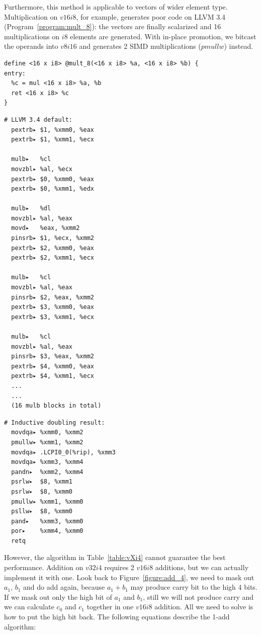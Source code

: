 Furthermore, this method is applicable to vectors of wider element type. Multiplication on $v16i8$, for example, generates poor code on LLVM 3.4 (Program~\ref{program:mult_8}): the vectors are finally scalarized and 16 multiplications on $i8$ elements are generated. With in-place promotion, we bitcast the operands into $v8i16$ and generates 2 SIMD multiplications ($pmullw$) instead.

\begin{program}
\begin{verbatim}
define <16 x i8> @mult_8(<16 x i8> %a, <16 x i8> %b) {
entry:
  %c = mul <16 x i8> %a, %b
  ret <16 x i8> %c
}
\end{verbatim}
\begin{multicols}{2}
\begin{verbatim}
# LLVM 3.4 default:
  pextrb▸ $1, %xmm0, %eax
  pextrb▸ $1, %xmm1, %ecx

  mulb▸   %cl
  movzbl▸ %al, %ecx
  pextrb▸ $0, %xmm0, %eax
  pextrb▸ $0, %xmm1, %edx

  mulb▸   %dl
  movzbl▸ %al, %eax
  movd▸   %eax, %xmm2
  pinsrb▸ $1, %ecx, %xmm2
  pextrb▸ $2, %xmm0, %eax
  pextrb▸ $2, %xmm1, %ecx

  mulb▸   %cl
  movzbl▸ %al, %eax
  pinsrb▸ $2, %eax, %xmm2
  pextrb▸ $3, %xmm0, %eax
  pextrb▸ $3, %xmm1, %ecx

  mulb▸   %cl
  movzbl▸ %al, %eax
  pinsrb▸ $3, %eax, %xmm2
  pextrb▸ $4, %xmm0, %eax
  pextrb▸ $4, %xmm1, %ecx
  ...
  ...
  (16 mulb blocks in total)
\end{verbatim}
\columnbreak
\begin{verbatim}
# Inductive doubling result:
  movdqa▸ %xmm0, %xmm2
  pmullw▸ %xmm1, %xmm2
  movdqa▸ .LCPI0_0(%rip), %xmm3
  movdqa▸ %xmm3, %xmm4
  pandn▸  %xmm2, %xmm4
  psrlw▸  $8, %xmm1
  psrlw▸  $8, %xmm0
  pmullw▸ %xmm1, %xmm0
  psllw▸  $8, %xmm0
  pand▸   %xmm3, %xmm0
  por▸    %xmm4, %xmm0
  retq
\end{verbatim}
\end{multicols}
\caption[Inductive doubling principle on $v16i8$ multiplication.]{Inductive doubling principle on $v16i8$ multiplication. LLVM 3.4 generate poor machine code, which will $pextrb$ every $i8$ field and multiply them with $mulb$. We simplify it through 2 $pmullw$, which is the multiplication on $v8i16$.}
\label{program:mult_8}
\end{program}

However, the algorithm in Table~\ref{table:vXi4} cannot guarantee the best performance. Addition on $v32i4$ requires 2 $v16i8$ additions, but we can actually implement it with one. Look back to Figure~\ref{figure:add_4}, we need to mask out $a_1$, $b_1$ and do add again, because $a_1 + b_1$ may produce carry bit to the high 4 bits. If we mask out only the high bit of $a_1$ and $b_1$, still we will not produce carry and we can calculate $c_0$ and $c_1$ together in one $v16i8$ addition. All we need to solve is how to put the high bit back. The following equations describe the 1-add algorithm:

